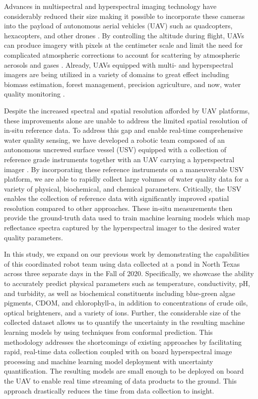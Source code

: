 \documentclass[sensors,article,submit,pdftex,moreauthors]{Definitions/mdpi}
\begin{document}
Advances in multispectral and hyperspectral imaging technology have considerably reduced their size making it possible to incorporate these cameras into the payload of autonomous aerial vehicles (UAV) such as quadcopters, hexacopters, and other drones \cite{hruska2012radiometric}. By controlling the altitude during flight, UAVs can produce imagery with pixels at the centimeter scale and limit the need for complicated atmospheric corrections to account for scattering by atmospheric aerosols and gases \cite{adao2017hyperspectral,banerjee2020uav}. Already, UAVs equipped with multi- and hyperspectral imagers are being utilized in a variety of domains to great effect including biomass estimation, forest management, precision agriculture, and now, water quality monitoring \cite{adao2017hyperspectral, padua2017uas,arroyo2019implementation,kurihara2020unmanned,ehmann2019monitoring, lu2021retrieval}.  

Despite the increased spectral and spatial resolution afforded by UAV platforms, these improvements alone are unable to address the limited spatial resolution of in-situ reference data.  To address this gap and enable real-time comprehensive water quality sensing, we have developed a robotic team composed of an autonomous uncrewed surface vessel (USV) equipped with a collection of reference grade instruments together with an UAV carrying a hyperspectral imager \cite{robotTeam1}. By incorporating these reference instruments on a maneuverable USV platform, we are able to rapidly collect large volumes of water quality data for a variety of physical, biochemical, and chemical parameters. Critically, the USV enables the collection of reference data with significantly improved spatial resolution compared to other approaches. These in-situ measurements then provide the ground-truth data used to train machine learning models which map reflectance spectra captured by the hyperspectral imager to the desired water quality parameters.

In this study, we expand on our previous work by demonstrating the capabilities of this coordinated robot team using data collected at a pond in North Texas across three separate days in the Fall of 2020. Specifically, we showcase the ability to accurately predict physical parameters such as temperature, conductivity, pH, and turbidity, as well as biochemical constituents including blue-green algae pigments, CDOM, and chlorophyll-a, in addition to concentrations of crude oils, optical brighteners, and a variety of ions. Further, the considerable size of the collected dataset allows us to quantify the uncertainty in the resulting machine learning models by using techniques from conformal prediction. This methodology addresses the shortcomings of existing approaches by facilitating rapid, real-time data collection coupled with on board hyperspectral image processing and machine learning model deployment with uncertainty quantification. The resulting models are small enough to be deployed on board the UAV to enable real time streaming of data products to the ground. This approach drastically reduces the time from data collection to insight.
\end{document}
